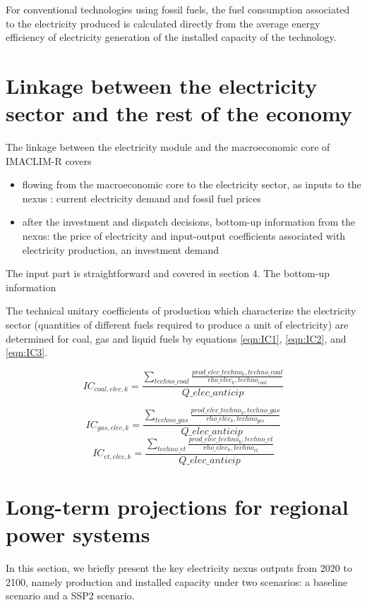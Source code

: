 For conventional technologies using fossil fuels, the fuel consumption associated to the electricity produced is calculated directly from the average energy efficiency of electricity generation of the installed capacity of the technology.

\section{Linkage between the electricity sector and the rest of the economy}

The linkage between the electricity module and the macroeconomic core of IMACLIM-R covers
\begin{itemize}
    \item flowing from the macroeconomic core to the electricity sector, as inputs to the nexus : current electricity demand and fossil fuel prices
    \item after the investment and dispatch decisions, bottom-up information from the nexus: the price of electricity and input-output coefficients associated with electricity production, an investment demand
\end{itemize}

The input part is straightforward and covered in section 4. The bottom-up information 


The technical unitary coefficients of production which characterize the electricity sector (quantities of different fuels required to produce a unit of electricity) are determined for coal, gas and liquid fuels by equations \ref{eqn:IC1}, \ref{eqn:IC2}, and  \ref{eqn:IC3}.

\begin{equation}
    IC_{coal,elec,k} = \frac{\sum_{techno\_coal}  \frac{prod\_elec\_techno_k,techno\_coal}{rho\_elec_k,techno_{coal}}}{Q\_elec\_anticip}
    \label{eqn:IC1}
\end{equation}

\begin{equation}
    IC_{gas,elec,k} = \frac{\sum_{techno\_gas}  \frac{prod\_elec\_techno_k,techno\_gas}{rho\_elec_k,techno_{gas}}}{Q\_elec\_anticip}
    \label{eqn:IC2}
\end{equation}
\begin{equation}
    IC_{et,elec,k} = \frac{\sum_{techno\_et}  \frac{prod\_elec\_techno_k,techno\_et}{rho\_elec_k,techno_{et}}}{Q\_elec\_anticip}
    \label{eqn:IC3}
\end{equation}

\section{Long-term projections for regional power systems}
In this section, we briefly present the key electricity nexus outputs from 2020 to 2100, namely production and installed capacity under two scenarios: a baseline scenario and a SSP2 scenario.

